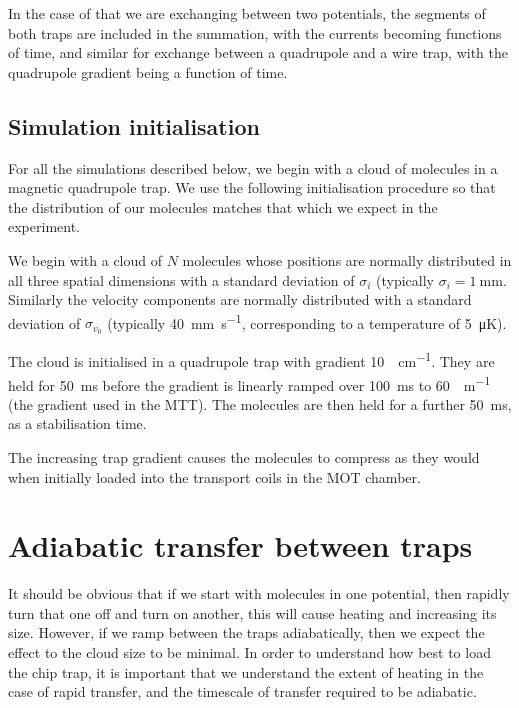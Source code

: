 In the case of that we are exchanging between
two potentials, the segments of both traps are included in the summation, with
the currents becoming functions of time, and similar for exchange between a
quadrupole and a wire trap, with the quadrupole gradient being a function of
time.


\subsection{Simulation initialisation}
\label{design:sim:init}

For all the simulations described below, we begin with a cloud of molecules in
a magnetic quadrupole trap. We use the following initialisation procedure so
that the distribution of our molecules matches that which we expect in the
experiment. 

We begin with a cloud of $N$ molecules whose positions are normally distributed
in all three spatial dimensions with a standard deviation of $\sigma_i$
(typically $\sigma_i = \SI{1}{\milli\meter}$. Similarly the velocity components
are normally distributed with a standard deviation of $\sigma_{v_0}$ (typically
\SI{40}{\milli\meter\per\second}, corresponding to a temperature of
\SI{5}{\micro\kelvin}). 

The cloud is initialised in a quadrupole trap with gradient
\SI{10}{\gauss\per\centi\meter}. They are held for \SI{50}{\milli\second}
before the gradient is linearly ramped over \SI{100}{\milli\second} to
\SI{60}{\gauss\per\meter} (the gradient used in the MTT).
The molecules are then held for a further \SI{50}{\milli\second}, as a
stabilisation time.

The increasing trap gradient causes the molecules to compress as they would
when initially loaded into the transport coils in the MOT chamber.


\section{Adiabatic transfer between traps}
\label{design:adiabatic}

It should be obvious that if we start with molecules in one potential, then
rapidly turn that one off and turn on another, this will cause heating and
increasing its size.  However, if we ramp between the traps adiabatically, then
we expect the effect to the cloud size to be minimal. In order to understand
how best to load the chip trap, it is important that we understand the extent
of heating in the case of rapid transfer, and the timescale of transfer
required to be adiabatic.

